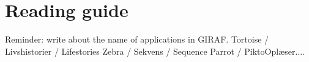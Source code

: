 \section*{Reading guide}

Reminder: write about the name of applications in GIRAF.
Tortoise / Livshistorier / Lifestories
Zebra / Sekvens / Sequence
Parrot / PiktoOplæser....